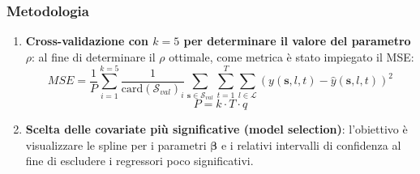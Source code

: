 \begin{frame}
	\frametitle{Metodologia}
	\centering
	\begin{enumerate}
		\justifying
		\item \textbf{Cross-validazione con $k=5$ per determinare il valore del parametro $\rho$}: al fine di determinare il $\rho$ ottimale, come metrica è stato impiegato il MSE:
		\begin{equation*}
			MSE = \frac{1}{P}\sum_{i=1}^{k=5}\frac{1}{\text{card}(\mathcal{S}_{val})_i}\sum_{\mathbf{s}\in\mathcal{S}_{val}}^{}\sum_{t=1}^{T}\sum_{l\in\mathcal{L}}^{} (y(\mathbf{s}, l, t) - \hat{y}(\mathbf{s}, l, t))^2
		\end{equation*}
		\begin{equation*}
			P = k\cdot T\cdot q
		\end{equation*}
		\item \textbf{Scelta delle covariate più significative (model selection)}: l'obiettivo è visualizzare le spline per i parametri $\boldsymbol{\beta}$ e i relativi intervalli di confidenza al fine di escludere i regressori poco significativi.

	\end{enumerate}	
\end{frame}
